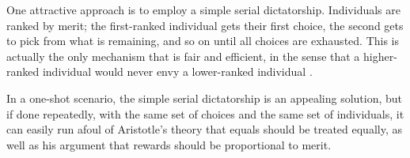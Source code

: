 

One attractive approach is to employ a simple serial
dictatorship. Individuals are ranked by merit; the first-ranked
individual gets their first choice, the second gets to pick from what
is remaining, and so on until all choices are exhausted. This is
actually the only mechanism that is fair and efficient, in the sense
that a higher-ranked individual would never envy a lower-ranked
individual \cite{balinski1999tale}.

In a one-shot scenario, the simple serial dictatorship is an appealing
solution, but if done repeatedly, with the same set of choices and the
same set of individuals, it can easily run afoul of Aristotle's theory
that equals should be treated equally, as well as his argument that
rewards should be proportional to merit.

